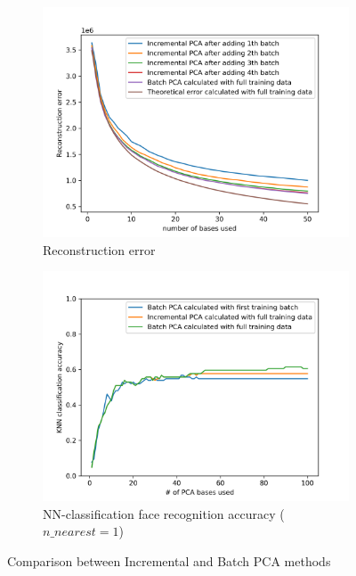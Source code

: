 \begin{figure}[t]
	\begin{subfigure}[t]{0.48\linewidth}
		\centering
		\includegraphics[width=\linewidth]{image/q2-fig3.png}
		\caption{Reconstruction error}
		\label{fig:q2-fig3}
	\end{subfigure}
	\hfill
	\begin{subfigure}[t]{0.48\linewidth}
		\centering
		\includegraphics[width=\linewidth]{image/q2-fig4.png}
		\caption{NN-classification face recognition accuracy ($n\_nearest=1$)}
		\label{fig:q2-fig4}
	\end{subfigure}
	\caption{Comparison between Incremental and Batch PCA methods}
	\label{fig:q2}
\end{figure}